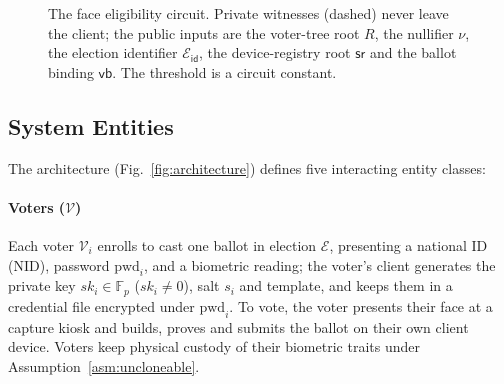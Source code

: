\documentclass[10pt,letterpaper,journal]{IEEEtran}
\begin{document}
\begin{figure}[t]
\begin{minipage}{0.48\textwidth}
{}
        \caption{The face eligibility circuit. Private witnesses (dashed) never leave the client; the public inputs are the voter-tree root $R$, the nullifier $\nu$, the election identifier $\mathcal{E}_{\mathsf{id}}$, the device-registry root $\mathsf{sr}$ and the ballot binding $\mathsf{vb}$. The threshold is a circuit constant.}
        \label{fig:zkp_circuit}
    \end{minipage}
\end{figure}


\subsection{System Entities}
The architecture (Fig.~\ref{fig:architecture}) defines five interacting entity classes:

\paragraph{Voters ($\mathcal{V}$)} Each voter $\mathcal{V}_i$ enrolls to cast one ballot in election $\mathcal{E}$, presenting a national ID (NID), password $\text{pwd}_i$, and a biometric reading; the voter's client generates the private key $sk_i \in \mathbb{F}_p$ ($sk_i \neq 0$), salt $s_i$ and template, and keeps them in a credential file encrypted under $\text{pwd}_i$. To vote, the voter presents their face at a capture kiosk and builds, proves and submits the ballot on their own client device. Voters keep physical custody of their biometric traits under Assumption~\ref{asm:uncloneable}.
\end{document}
